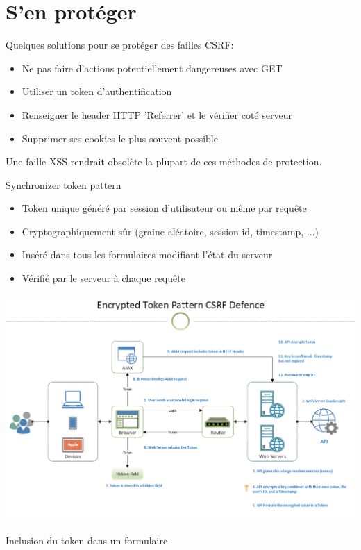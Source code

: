 \section{S'en protéger}


\frame{\tableofcontents[currentsection]}


\begin{frame}

Quelques solutions pour se protéger des failles CSRF:
\\
\begin{itemize}
\item Ne pas faire d'actions potentiellement dangereuses avec GET
\item Utiliser un token d'authentification
\item Renseigner le header HTTP 'Referrer' et le vérifier coté serveur
\item Supprimer ses cookies le plus souvent possible
\end{itemize}

Une faille XSS rendrait obsolète la plupart de ces méthodes de protection.

\end{frame}

\begin{frame}
\begin{block}{Synchronizer token pattern}
\begin{itemize}
\item Token unique généré par session d'utilisateur ou même par requête
\item Cryptographiquement sûr (graine aléatoire, session id, timestamp, ...)
\item Inséré dans tous les formulaires modifiant l'état du serveur
\item Vérifié par le serveur à chaque requête
\end{itemize}
\end{block}
\end{frame}

\begin{frame}
\centerline{\includegraphics[scale=0.35]{encrypted-token-pattern.png}}
\end{frame}

\begin{frame}
\begin{block}{Inclusion du token dans un formulaire}

\end{block}
\end{frame}

